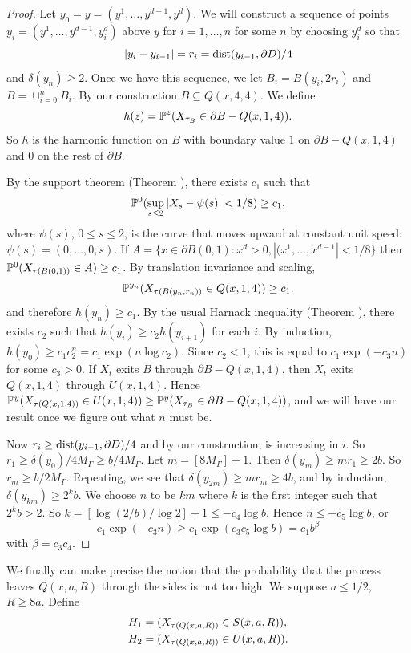 \begin{proof}
Let $y_0 = y = (y^1,\ldots,y^{d-1},y^d)$. We will construct a sequence of points $y_i = (y^1,\ldots,y^{d-1},y_i^d)$ above $y$ for $i=1,\ldots,n$ for some $n$ by choosing $y_i^d$ so that
\mpagebreak
\[
    |y_i - y_{i-1}| = r_i = \dist(y_{i-1},\partial D)/4
\]
and $\delta(y_n) \geq 2$. Once we have this sequence, we let $B_i = B(y_i,2r_i)$ and $B = \cup_{i=0}^n B_i$. By our construction $B \subseteq Q(x,4,4)$. We define
\[
    h(z) = \P^z(X_{\tau_B} \in \partial B - Q(x,1,4)).
\]
So $h$ is the harmonic function on $B$ with boundary value $1$ on $\partial B-Q(x,1,4)$ and $0$ on the rest of $\partial B$.

By the support theorem (Theorem ), there exists $c_1$ such that
\[
    \P^0(\sup_{s\leq 2}|X_s - \psi(s)| < 1/8) \geq c_1,
\]
where $\psi(s)$, $0 \leq s \leq 2$, is the curve that moves upward at constant unit speed: $\psi(s) = (0,\ldots,0,s)$. If $A = \{x \in \partial B(0,1) : x^d > 0, |(x^1,\ldots,x^{d-1}| < 1/8\}$ then $\P^0(X_{\tau(B(0,1))} \in A) \geq c_1$. By translation invariance and scaling,
\[
    \P^{y_n}(X_{\tau(B(y_n,r_n))} \in Q(x,1,4)) \geq c_1.
\]
and therefore $h(y_n) \geq c_1$. By the usual Harnack inequality (Theorem ), there exists $c_2$ such that $h(y_i) \geq c_2h(y_{i+1})$ for each $i$. By induction, $h(y_0) \geq c_1c_2^n = c_1\exp(n\log c_2)$. Since $c_2 < 1$, this is equal to $c_1\exp(-c_3n)$ for some $c_3 > 0$. If $X_t$ exits $B$ through $\partial B - Q(x,1,4)$, then $X_t$ exits $Q(x,1,4)$ through $U(x,1,4)$. Hence $\P^y(X_{\tau(Q(x,1,4))} \in U(x,1,4)) \geq \P^y(X_{\tau_B} \in \partial B - Q(x,1,4))$, and we will have our result once we figure out what $n$ must be.

Now $r_i \geq \dist(y_{i-1},\partial D)/4$ and by our construction, is increasing in $i$. So $r_1 \geq \delta(y_0)/4M_\Gamma \geq b/4M_\Gamma$. Let $m = [8M_\Gamma] + 1$. Then $\delta(y_m) \geq mr_1 \geq 2b$. So $r_m \geq b/2M_\Gamma$. Repeating, we see that $\delta(y_{2m}) \geq mr_m \geq 4b$, and by induction, $\delta(y_{km}) \geq 2^k b$. We choose $n$ to be $km$ where $k$ is the first integer such that $2^k b > 2$. So $k = [\log(2/b)/\log 2] + 1 \leq -c_4\log b$. Hence $n \leq -c_5\log b$, or
\[
    c_1\exp(-c_3n) \geq c_1\exp(c_3c_5\log b) = c_1b^\beta
\]
with $\beta = c_3c_4$.
\end{proof}

We finally can make precise the notion that the probability that the process leaves $Q(x,a,R)$ through the sides is not too high. We suppose $a \leq 1/2$, $R \geq 8a$. Define
\begin{align}\label{eq:ch3_1.12}
    H_1 &= (X_{\tau(Q(x,a,R))} \in S(x,a,R)), \\
    H_2 &= (X_{\tau(Q(x,a,R))} \in U(x,a,R)). \notag
\end{align}

